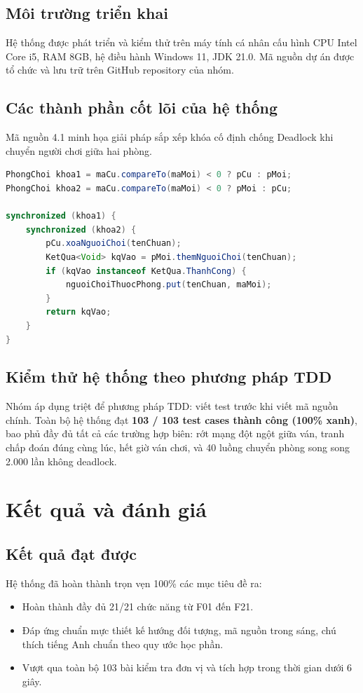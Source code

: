 \documentclass[12pt,a4paper,oneside]{report}
\begin{document}
\section{Môi trường triển khai}
Hệ thống được phát triển và kiểm thử trên máy tính cá nhân cấu hình CPU Intel Core i5, RAM 8GB, hệ điều hành Windows 11, JDK 21.0. Mã nguồn dự án được tổ chức và lưu trữ trên GitHub repository của nhóm.

\section{Các thành phần cốt lõi của hệ thống}
Mã nguồn 4.1 minh họa giải pháp sắp xếp khóa cố định chống Deadlock khi chuyển người chơi giữa hai phòng.

\begin{lstlisting}[language=Java, caption={Thuật toán Lock Ordering chống Deadlock khi chuyển phòng trong QuanLyPhongChoi.java}]
PhongChoi khoa1 = maCu.compareTo(maMoi) < 0 ? pCu : pMoi;
PhongChoi khoa2 = maCu.compareTo(maMoi) < 0 ? pMoi : pCu;

synchronized (khoa1) {
    synchronized (khoa2) {
        pCu.xoaNguoiChoi(tenChuan);
        KetQua<Void> kqVao = pMoi.themNguoiChoi(tenChuan);
        if (kqVao instanceof KetQua.ThanhCong) {
            nguoiChoiThuocPhong.put(tenChuan, maMoi);
        }
        return kqVao;
    }
}
\end{lstlisting}

\section{Kiểm thử hệ thống theo phương pháp TDD}
Nhóm áp dụng triệt để phương pháp TDD: viết test trước khi viết mã nguồn chính. Toàn bộ hệ thống đạt \textbf{103 / 103 test cases thành công (100\% xanh)}, bao phủ đầy đủ tất cả các trường hợp biên: rớt mạng đột ngột giữa ván, tranh chấp đoán đúng cùng lúc, hết giờ ván chơi, và 40 luồng chuyển phòng song song 2.000 lần không deadlock.

\chapter{Kết quả và đánh giá}

\section{Kết quả đạt được}
Hệ thống đã hoàn thành trọn vẹn 100\% các mục tiêu đề ra:
\begin{itemize}
  \item Hoàn thành đầy đủ 21/21 chức năng từ F01 đến F21.
  \item Đáp ứng chuẩn mực thiết kế hướng đối tượng, mã nguồn trong sáng, chú thích tiếng Anh chuẩn theo quy ước học phần.
  \item Vượt qua toàn bộ 103 bài kiểm tra đơn vị và tích hợp trong thời gian dưới 6 giây.
\end{itemize}
\end{document}
